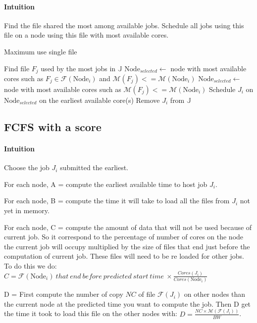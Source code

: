 \documentclass[a4paper]{article}
\newcommand{\Node}[1]{\ensuremath{\mathrm{Node}_{#1}}\xspace}
\newcommand{\inputs}{\ensuremath{\mathcal{F}}\xspace}
\newcommand{\memory}{\ensuremath{\mathcal{M}}\xspace}
\newcommand{\core}{\mathit{Cores}\xspace}
\newcommand{\jobset}{\ensuremath{\mathbb{J}}\xspace}
\begin{document}
\paragraph{Intuition}
Find the file shared the most among available jobs.
Schedule all jobs using this file on a node using this file with most available cores.
\begin{algorithm}[H]
\caption{Maximum use single file}
\begin{algorithmic}[1]
\While{$\jobset != \emptyset$}
	\State Find file $F_j$ used by the most jobs in $\jobset$
	\State $\Node{selected} \gets$ node with most available cores such as $F_j \in \inputs(\Node{i})$ and $\memory(F_j) <= \memory(\Node{i})$
	\If{$\Node{selected} = \emptyset$}
		\State $\Node{selected} \gets$ node with most available cores such as $\memory(F_j) <= \memory(\Node{i})$
	\EndIf
	\ForEach {$J_i \in \jobset$ such as $F_j \in \inputs(J_i)$}
		\State Schedule $J_i$ on $\Node{selected}$ on the earliest available core(s)
		\State Remove $J_i$ from $\jobset$
	\EndFor
\EndWhile
\end{algorithmic}
\end{algorithm}

\subsection{FCFS with a score}
\paragraph{Intuition}
Choose the job $J_i$ submitted the earliest.

For each node, A = compute the earliest available time to host job $J_i$.

For each node, B = compute the time it will take to load all the files from $J_i$ not yet in memory.

For each node, C = compute the amount of data that will not be used because of current job. So it correspond to the percentage of number of cores on the node the current job will occupy multiplied by the size of files that end just before the computation of current job. These files will need to be re loaded for other jobs.
To do this we do: $C = \inputs(\Node{i})~that~end~before~predicted~start~time~ \times \frac{\core(J_i)}{\core(\Node{i})}$

D = First compute the number of copy $NC$ of file $\inputs(J_i)$ on other nodes than the current node at the predicted time you want to compute the job. Then D get the time it took to load this file on the other nodes with: $D = \frac{NC \times \memory(\inputs(J_i))}{BW}$.
\end{document}
